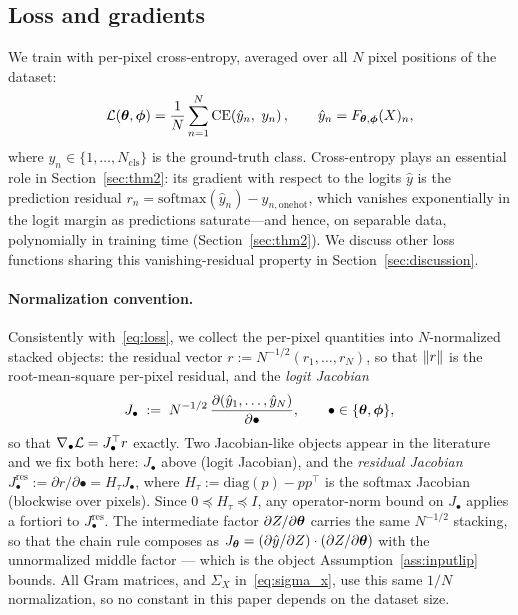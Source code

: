 \subsection{Loss and gradients}

We train with per-pixel cross-entropy, averaged over all $N$ pixel
positions of the dataset:
\begin{equation}
\label{eq:loss}
    \mathcal{L}({\boldsymbol{\theta}}, {\boldsymbol{\phi}}) = \frac{1}{N} \sum_{n=1}^{N}
    \mathrm{CE}\!\left( \hat{y}_n,\ y_n \right),
    \qquad \hat{y}_n = F_{{\boldsymbol{\theta}},{\boldsymbol{\phi}}}(X)_n ,
\end{equation}
where $y_n \in \{1, \dots, N_{\mathrm{cls}}\}$ is the ground-truth
class. Cross-entropy plays an essential role in
Section~\ref{sec:thm2}: its gradient with respect to the logits
$\hat{y}$ is the prediction residual
$r_n = \mathrm{softmax}(\hat{y}_n) - y_{n,\mathrm{onehot}}$, which
vanishes exponentially in the logit margin as predictions
saturate---and hence, on separable data, polynomially in training
time (Section~\ref{sec:thm2}). We discuss other loss functions
sharing this vanishing-residual property in
Section~\ref{sec:discussion}.

\paragraph{Normalization convention.}
Consistently with~\eqref{eq:loss}, we collect the per-pixel
quantities into $N$-normalized stacked objects: the residual vector
$r := N^{-1/2} (r_1, \dots, r_N)$, so that $\left\lVert r\right\rVert$ is the
root-mean-square per-pixel residual, and the \emph{logit Jacobian}
\begin{equation}
\label{eq:jacobians}
    J_\bullet \;:=\; N^{-1/2}\,
    \frac{\partial (\hat{y}_1, \dots, \hat{y}_N)}{\partial \bullet},
    \qquad \bullet \in \{{\boldsymbol{\theta}}, {\boldsymbol{\phi}}\},
\end{equation}
so that $\nabla_\bullet \mathcal{L} = J_\bullet^\top r$ exactly. Two
Jacobian-like objects appear in the literature and we fix both here:
$J_\bullet$ above (logit Jacobian), and the \emph{residual Jacobian}
$J_\bullet^{\mathrm{res}} := \partial r / \partial \bullet =
H_\tau J_\bullet$, where
$H_\tau := \mathrm{diag}(p) - p p^\top$ is the softmax Jacobian
(blockwise over pixels). Since $0 \preceq H_\tau \preceq I$, any
operator-norm bound on $J_\bullet$ applies a fortiori to
$J_\bullet^{\mathrm{res}}$. The intermediate factor
$\partial Z/\partial {\boldsymbol{\theta}}$ carries the same $N^{-1/2}$ stacking,
so that the chain rule composes as
$J_{\boldsymbol{\theta}} = (\partial \hat{y}/\partial Z) \cdot
(\partial Z/\partial {\boldsymbol{\theta}})$ with the unnormalized middle factor
--- which is the object Assumption~\ref{ass:inputlip} bounds. All
Gram matrices, and $\Sigma_X$ in~\eqref{eq:sigma_x}, use this same
$1/N$ normalization, so no constant in this paper depends on the
dataset size.

